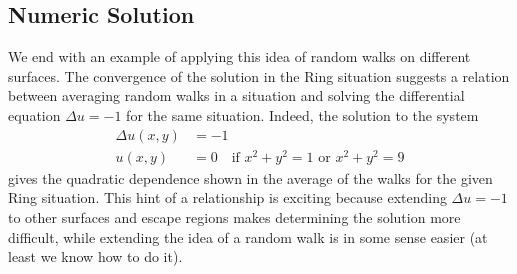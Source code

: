 \documentclass[12pt]{article}
\begin{document}
	\subsection{Numeric Solution} \label{NumericSoln}
		We end with an example of applying this idea of random walks on different surfaces.
		The convergence of the solution in the Ring situation suggests a relation between averaging random walks in a situation and solving the differential equation $\Delta u = -1$ for the same situation.
		Indeed, the solution to the system
		\begin{equation*} \begin{split} 
			\Delta u(x,y) & = -1 \\
			u(x,y) & = 0 \quad\text{if } x^2+y^2 = 1 \text{ or } x^2+y^2 = 9
		\end{split} \end{equation*}
		gives the quadratic dependence shown in the average of the walks for the given Ring situation.
		This hint of a relationship is exciting because extending $\Delta u = -1$ to other surfaces and escape regions makes determining the solution more difficult, while extending the idea of a random walk is in some sense easier (at least we know how to do it).
	


\end{document}
